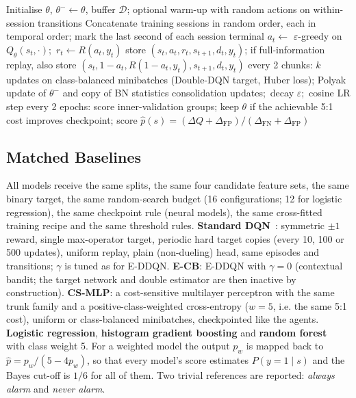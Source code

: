 \begin{algorithm}[t]
\caption{Corrected E-DDQN training for one inner split}
\label{alg:eddqn}
\begin{algorithmic}[1]
\small
\State Initialise $\theta$, $\theta^-\!\leftarrow\theta$, buffer $\mathcal{D}$; optional warm-up with random actions on within-session transitions
  \State Concatenate training sessions in random order, each in temporal order; mark the last second of each session terminal
    \State $a_t\gets$ $\varepsilon$-greedy on $Q_\theta(s_t,\cdot)$;\ $r_t\gets R(a_t,y_t)$
    \State store $(s_t,a_t,r_t,s_{t+1},d_t,y_t)$; if full-information replay, also store $(s_t,1-a_t,R(1-a_t,y_t),s_{t+1},d_t,y_t)$
    \State every 2 chunks: $k$ updates on class-balanced minibatches (Double-DQN target, Huber loss); Polyak update of $\theta^-$ and copy of BN statistics
  \EndFor
   consolidation updates;\ decay $\varepsilon$;\ cosine LR step
  \State every 2 epochs: score inner-validation groups; keep $\theta$ if the achievable 5:1 cost improves
\EndFor
\State \Return checkpoint; score $\hat p(s)=(\Delta Q+\Delta_{\mathrm{FP}})/(\Delta_{\mathrm{FN}}+\Delta_{\mathrm{FP}})$
\end{algorithmic}
\end{algorithm}

\subsection{Matched Baselines}
\label{sec:baselines}
All models receive the same splits, the same four candidate feature sets, the same binary target, the same random-search budget (16 configurations; 12 for logistic regression), the same checkpoint rule (neural models), the same cross-fitted training recipe and the same threshold rules. \textbf{Standard DQN}~\cite{mnih2015human}: symmetric $\pm1$ reward, single max-operator target, periodic hard target copies (every 10, 100 or 500 updates), uniform replay, plain (non-dueling) head, same episodes and transitions; $\gamma$ is tuned as for E-DDQN. \textbf{E-CB}: E-DDQN with $\gamma=0$ (contextual bandit; the target network and double estimator are then inactive by construction). \textbf{CS-MLP}: a cost-sensitive multilayer perceptron with the same trunk family and a positive-class-weighted cross-entropy ($w=5$, i.e. the same 5:1 cost), uniform or class-balanced minibatches, checkpointed like the agents. \textbf{Logistic regression}, \textbf{histogram gradient boosting} and \textbf{random forest}~\cite{pedregosa2011sklearn} with class weight 5. For a weighted model the output $p_w$ is mapped back to $\hat p=p_w/(5-4p_w)$, so that every model's score estimates $P(y=1\mid s)$ and the Bayes cut-off is $1/6$ for all of them. Two trivial references are reported: \emph{always alarm} and \emph{never alarm}.

